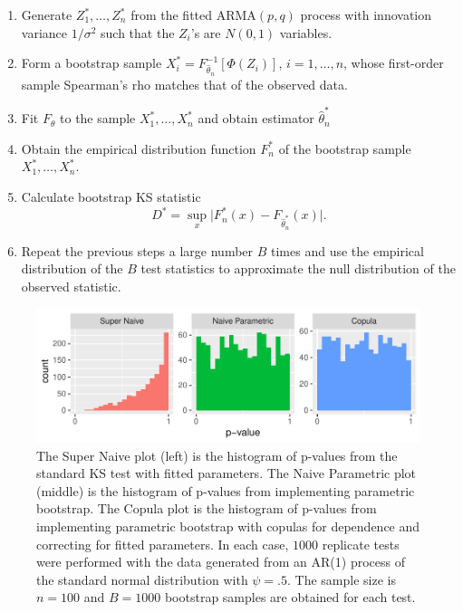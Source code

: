 \documentclass[12pt, letterpaper, titlepage]{article}
\begin{document}
\begin{enumerate}
\item
  Generate $Z_1^*, \ldots, Z_n^*$ from the fitted ARMA$(p, q)$ process
  with innovation variance $1 / \sigma^2$ such that the $Z_i$'s are $N(0, 1)$ variables.
\item
  Form a bootstrap sample $X_i^* = F^{-1}_{\hat\theta_n} [\Phi(Z_i)]$,
  $i = 1, \ldots, n$, whose first-order sample Spearman's rho matches that of
  the observed data.
\item
  Fit $F_\theta$ to the sample $X_1^*, \ldots, X_n^*$ and obtain estimator
  $\hat\theta_n^*$
\item
  Obtain the empirical distribution function $F_n^*$ of the bootstrap sample
  $X_1^*, \ldots, X_n^*$.
\item
  Calculate bootstrap KS statistic
  \[
    D^* = \sup_x \lvert F_n^* (x)- F_{\hat\theta_n^*}(x) \rvert.
  \]
\item
  Repeat the previous steps a large number $B$ times and use the empirical
    distribution of the $B$ test statistics to approximate
    the null distribution of the observed statistic.
\end{enumerate}

\begin{figure}[tbp]
  \centering
  \includegraphics[width=\textwidth]{hist_ar1_FD}
  \caption{The Super Naive plot (left) is the histogram of p-values from the
  standard KS test with fitted parameters. The Naive Parametric plot (middle) is
  the histogram of p-values from implementing parametric bootstrap. The Copula
  plot is the histogram of p-values from implementing parametric bootstrap with
  copulas for dependence and correcting for fitted parameters. In each case,
  $1000$ replicate tests were performed with the data generated from an AR(1)
  process of the standard normal distribution with $\psi = .5$. The sample size
  is $n = 100$ and $B = 1000$ bootstrap samples are obtained for each test.}
  \label{fig:hist_ar1_FD}
\end{figure}
\end{document}
